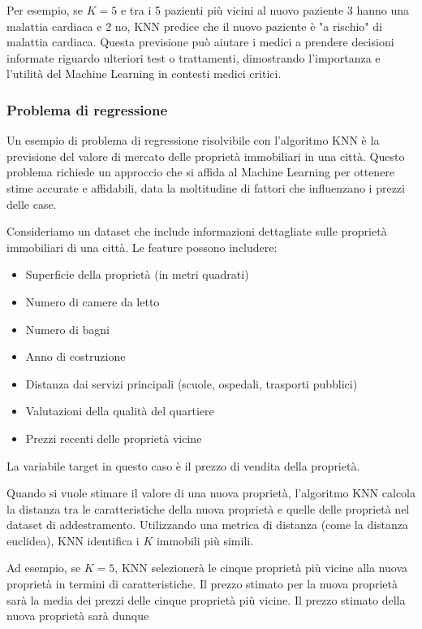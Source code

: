 Per esempio, se \( K = 5 \) e tra i 5 pazienti più vicini al nuovo paziente 3 hanno una malattia cardiaca e 2 no, KNN predice che il nuovo paziente è "a rischio" di malattia cardiaca. Questa previsione può aiutare i medici a prendere decisioni informate riguardo ulteriori test o trattamenti, dimostrando l'importanza e l'utilità del Machine Learning in contesti medici critici.

\subsubsection{Problema di regressione}

Un esempio di problema di regressione risolvibile con l'algoritmo KNN è la previsione del valore di mercato delle proprietà immobiliari in una città. Questo problema richiede un approccio che si affida al Machine Learning per ottenere stime accurate e affidabili, data la moltitudine di fattori che influenzano i prezzi delle case.

Consideriamo un dataset che include informazioni dettagliate sulle proprietà immobiliari di una città. Le feature possono includere:

\begin{itemize}
    \item Superficie della proprietà (in metri quadrati)
    \item Numero di camere da letto
    \item Numero di bagni
    \item Anno di costruzione
    \item Distanza dai servizi principali (scuole, ospedali, trasporti pubblici)
    \item Valutazioni della qualità del quartiere
    \item Prezzi recenti delle proprietà vicine
\end{itemize}

La variabile target in questo caso è il prezzo di vendita della proprietà.

Quando si vuole stimare il valore di una nuova proprietà, l'algoritmo KNN calcola la distanza tra le caratteristiche della nuova proprietà e quelle delle proprietà nel dataset di addestramento. Utilizzando una metrica di distanza (come la distanza euclidea), KNN identifica i \( K \) immobili più simili. 

Ad esempio, se \( K = 5 \), KNN selezionerà le cinque proprietà più vicine alla nuova proprietà in termini di caratteristiche. Il prezzo stimato per la nuova proprietà sarà la media dei prezzi delle cinque proprietà più vicine.
Il prezzo stimato della nuova proprietà sarà dunque


